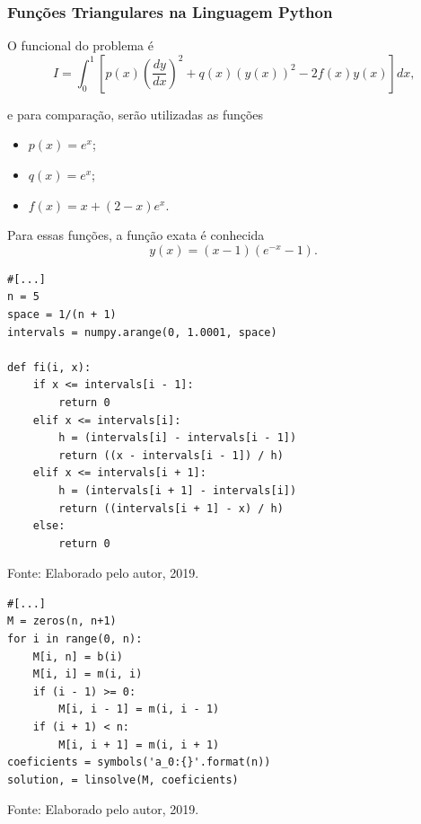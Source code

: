 \documentclass{beamer}
\newcommand{\fonte}[1]{
	\begin{center}
		\footnotesize Fonte: #1
	\end{center}
}
\newcommand{\fonteElaboradoPeloAutor}{
	\fonte{Elaborado pelo autor, 2019.}
}
\newif\ifcompilepause
\newcommand{\cpause}{
	\ifcompilepause
	\pause
	\fi
}
\begin{document}
	\begin{frame}
		\frametitle{Funções Triangulares na Linguagem Python}
		\justify
		
		O funcional do problema é
		$$
			I = \int_{0}^{1} \left [ 
					p(x) \left ( 
						\frac{dy}{dx}
					\right )^2
					+ q(x)(y(x))^2 
					- 2f(x)y(x) 
				\right ] dx
				\text{,}
		$$
		\cpause
		e para comparação, serão utilizadas as funções
		\begin{itemize}
			\item $p(x)=e^x$;
			\item $q(x)=e^x$;
			\item $f(x)=x+(2-x)e^x$.
		\end{itemize}
		\cpause
		
		Para essas funções, a função exata é conhecida
		$$
			y(x)=(x-1)(e^{-x}-1)
			\text{.}
		$$
	\end{frame}
		
	\begin{frame}[containsverbatim]
		\vspace{-8pt}
		\begin{lstlisting}[style=Python, numbers=none, caption={Trechos do código sobre funções triangulares}, captionpos=t]
#[...]
n = 5
space = 1/(n + 1)
intervals = numpy.arange(0, 1.0001, space)

def fi(i, x):
    if x <= intervals[i - 1]:
        return 0
    elif x <= intervals[i]:
        h = (intervals[i] - intervals[i - 1])
        return ((x - intervals[i - 1]) / h)
    elif x <= intervals[i + 1]:
        h = (intervals[i + 1] - intervals[i])
        return ((intervals[i + 1] - x) / h)
    else:
        return 0
		\end{lstlisting}
		\fonteElaboradoPeloAutor
	\end{frame}
	
	\begin{frame}[containsverbatim]
		\begin{lstlisting}[style=Python, numbers=none, caption={Trechos do código sobre funções triangulares}, captionpos=t]
#[...]
M = zeros(n, n+1)
for i in range(0, n):
    M[i, n] = b(i)
    M[i, i] = m(i, i)
    if (i - 1) >= 0:
        M[i, i - 1] = m(i, i - 1)
    if (i + 1) < n:
        M[i, i + 1] = m(i, i + 1)
coeficients = symbols('a_0:{}'.format(n))
solution, = linsolve(M, coeficients)
		\end{lstlisting}
		\fonteElaboradoPeloAutor
	\end{frame}
	
\end{document}
